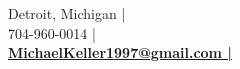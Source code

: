 \hspace*{0pt}\hfill Detroit, Michigan | \textcolor{gold}{\faHome} \\
\hspace*{0pt}\hfill 704-960-0014 | \textcolor{gold}{\faPhoneSquare} \\
\hspace*{0pt}\hfill \textbf{\href{mailto:MichaelKeller1997@gmail.com}{MichaelKeller1997@gmail.com | \textcolor{gold}{\faEnvelopeSquare}}} \\